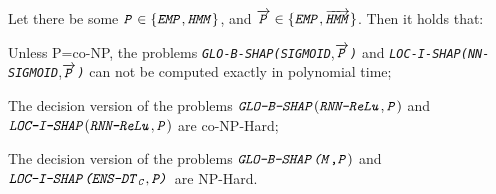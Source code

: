 
\begin{corollary} \label{cor:globshaphard}
    \begin{inparaenum}[(i)]
    Let there be some $\texttt{\emph{P}} \in \{ \texttt{\emph{EMP}}, \texttt{\emph{HMM}}\}$, and $\overrightarrow{\texttt{\emph{P}}} \in \{\texttt{\emph{EMP}}, \overrightarrow{\texttt{\emph{HMM}}} \}$. Then it holds that:
        \item%
        Unless P=co-NP, the problems \texttt{\emph{GLO-B-SHAP}}\texttt{\emph{(SIGMOID}},$\overrightarrow{\texttt{\emph{P}}}$\texttt{\emph{)}} and \texttt{\emph{LOC-I-SHAP}}\texttt{\emph{(NN-SIGMOID}},$\overrightarrow{\texttt{\emph{P}}}$\texttt{\emph{)}} can not be computed exactly in polynomial time;
        \item %
        The decision version of the problems $\texttt{\emph{GLO-B-SHAP}}(\texttt{\emph{RNN-ReLu}}, \texttt{\emph{P}})$ and $\texttt{\emph{LOC-I-SHAP}}(\texttt{\emph{RNN-ReLu}}, \texttt{\emph{P}})$ are co-NP-Hard;
        \item %
        The decision version of the problems $\texttt{\emph{GLO-B-SHAP}\texttt{\emph{(M}},\texttt{\emph{P}}})$ and $\texttt{\emph{LOC-I-SHAP}}\texttt{\emph{(ENS-DT}}_{\texttt{\emph{C}}},\texttt{\emph{P)}}$ are NP-Hard. 
    \end{inparaenum} 
\end{corollary}


